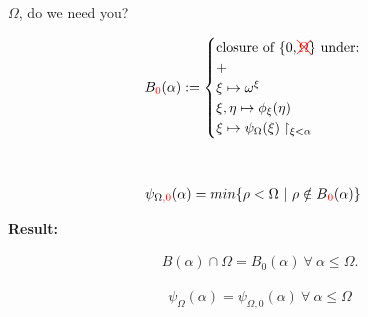 \documentclass{beamer}
\begin{document}
\begin{frame}{$\Omega$, do we need you?}
\centering
\begin{minipage}{0.45\textwidth}
	\begin{align*}
		B_{\color{red}{0}}(\alpha) := 
		\begin{cases}
			\text{closure of } \{0,\color{red}\xcancel{\Omega}\color{black}\} \text{ under:} \\
			+ \\
			 \xi \mapsto \omega^\xi \\ 
			 \xi, \eta \mapsto \phi_{\xi}(\eta) \\ 
			\xi \mapsto \psi_{\Omega}(\xi) \upharpoonright_{\xi < \alpha} 
		\end{cases}\\
	\end{align*}
\end{minipage}\hfill \\


    \begin{minipage}{0.45\textwidth}
	\begin{align*}
		\psi_{\Omega\color{red},0\color{black}}(\alpha) &= min\{ \rho < \Omega \  | \  \rho \notin B\color{red}_0\color{black}(\alpha) \} 
	\end{align*}
    \end{minipage} \pause

 \textbf{Result:} 

\begin{minipage}{0.45\textwidth}
	\begin{align*}
		B(\alpha) \cap \Omega =B_{0}(\alpha)\ \forall\ \alpha \leq \Omega.
	\end{align*}
\end{minipage}\pause



\begin{minipage}{0.45\textwidth}
	\begin{align*}
		\psi_{\Omega}(\alpha)=\psi_{\Omega,0}(\alpha)\ \forall\ \alpha \leq \Omega
	\end{align*}
\end{minipage}


\end{frame}
\end{document}
